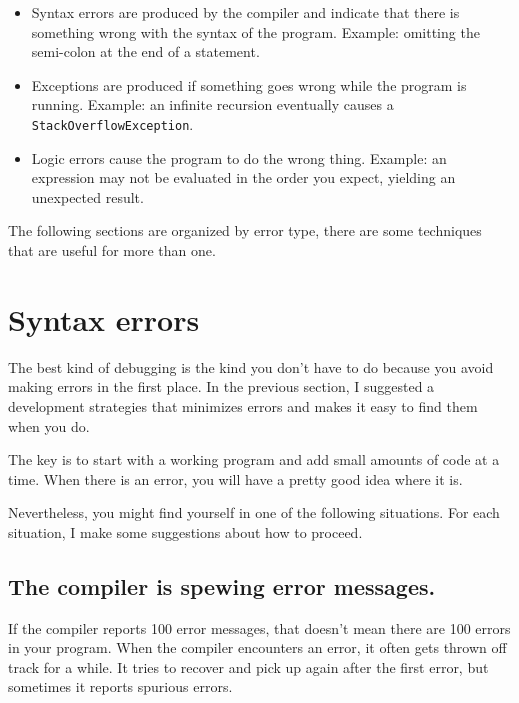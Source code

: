 \documentclass[12pt]{book}
\theoremstyle{definition}
\begin{document}
\begin{itemize}

\item Syntax errors are produced by the compiler and indicate that
  there is something wrong with the syntax of the program.  Example:
  omitting the semi-colon at the end of a statement.

\item Exceptions are produced if something goes wrong while the
  program is running.  Example: an infinite recursion eventually
  causes a {\tt StackOverflowException}.

\item Logic errors cause the program to do the wrong thing.  Example:
  an expression may not be evaluated in the order you expect, yielding
  an unexpected result.

\end{itemize}


The following sections are
organized by error type, there are some techniques that are
useful for more than one.


\section{Syntax errors}

The best kind of debugging is the kind you don't have to do
because you avoid making errors in the first place.  In the
previous section, I suggested a development strategies that
minimizes errors and makes it easy
to find them when you do.

The key is to start with a working program and add small
amounts of code at a time.  When there is an error, you will
have a pretty good idea where it is.

Nevertheless, you might find yourself in one of the following
situations.  For each situation, I make some suggestions about
how to proceed.


\subsection*{The compiler is spewing error messages.}

If the compiler reports 100 error messages, that doesn't mean
there are 100 errors in your program.  When the compiler encounters
an error, it often gets thrown off track for a while.  It tries to
recover and pick up again after the first error, but sometimes
it reports spurious errors.
\end{document}
